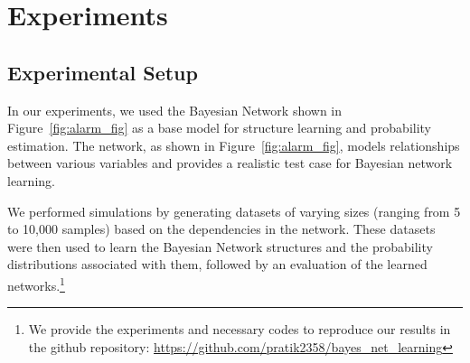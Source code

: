\section{Experiments}
\subsection{Experimental Setup}
In our experiments, we used the  Bayesian Network shown in Figure~\ref{fig:alarm_fig} as a base model for structure learning and probability estimation. The network, as shown in Figure~\ref{fig:alarm_fig}, models relationships between various variables and provides a realistic test case for Bayesian network learning.

We performed simulations by generating datasets of varying sizes (ranging from 5 to 10,000 samples) based on the dependencies in the network. These datasets were then used to learn the Bayesian Network structures and the probability distributions associated with them, followed by an evaluation of the learned networks.\footnote{We provide the experiments and necessary codes to reproduce our results in the github repository: \url{https://github.com/pratik2358/bayes_net_learning}}
